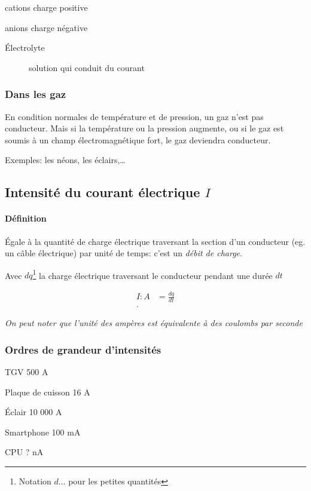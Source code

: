 \documentclass{article}
\newenvironment{definition}{\begin{description}[leftmargin=!,labelwidth=\widthof{\bfseries Lorem ipsum dolor}]}{\end{description}}
\begin{document}
\begin{definition}
	\item[cations] charge positive
	\item[anions] charge négative
\end{definition}

\begin{description}
	\item[Électrolyte] solution qui conduit du courant
\end{description}

\subsubsection{Dans les gaz}
En condition normales de température et de pression, un gaz n'est pas conducteur. Mais si la température ou la pression augmente, ou si le gaz est soumis à un champ électromagnétique fort, le gaz deviendra conducteur.

Exemples: les néons, les éclairs,\ldots

\subsection{Intensité du courant électrique $I$}
\paragraph{Définition} Égale à la quantité de charge électrique traversant la section d'un conducteur (eg. un câble électrique) par unité de temps: c'est un \emph{débit de charge}.

Avec $dq$\footnote{Notation $d\ldots$ pour les petites quantités} la charge électrique traversant le conducteur pendant une durée $dt$

\begin{align*}
	I: A &= \frac{dq}{dt} \\
.\end{align*}

\emph{On peut noter que l'unité des ampères est équivalente à des coulombs par seconde} 

\subsubsection{Ordres de grandeur d'intensités}

\begin{definition}
	\item[TGV] 500 A
	\item[Plaque de cuisson] 16 A
	\item[Éclair] 10 000 A
	\item[Smartphone] 100 mA
	\item[CPU] ? nA
\end{definition}
\end{document}
